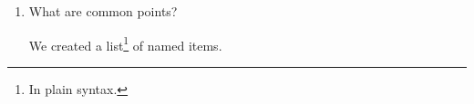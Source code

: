 \documentclass{article}
\begin{document}
\begin{enumerate}
	\item What are common points?
	\begin{tcolorbox}
	We created a list\footnote{In plain syntax.} of named items.
	\end{tcolorbox}
\end{enumerate}
\gdef\SatexReachedEnd{}
\end{document}

